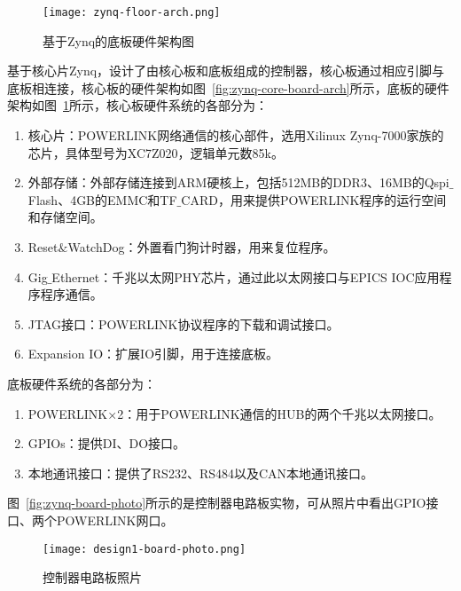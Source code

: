 \begin{figure}[!htb]
  \centering
  \texttt{[image: zynq-floor-arch.png]}
  \caption{基于Zynq的底板硬件架构图}
  \label{fig:zynq-floor-arch}
\end{figure}

基于核心片Zynq，设计了由核心板和底板组成的控制器，核心板通过相应引脚与底板相连接，核心板的硬件架构如图~\ref{fig:zynq-core-board-arch}所示，底板的硬件架构如图~\ref{fig:zynq-floor-arch}所示，核心板硬件系统的各部分为：

\begin{enumerate}
  \item 核心片：POWERLINK网络通信的核心部件，选用Xilinux Zynq-7000家族的芯片，具体型号为XC7Z020，逻辑单元数85k。

  \item 外部存储：外部存储连接到ARM硬核上，包括512MB的DDR3、16MB的Qspi$\_$Flash、4GB的EMMC和TF$\_$CARD，用来提供POWERLINK程序的运行空间和存储空间。

  \item Reset$\&$WatchDog：外置看门狗计时器，用来复位程序。

  \item Gig$\_$Ethernet：千兆以太网PHY芯片，通过此以太网接口与EPICS IOC应用程序程序通信。

  \item JTAG接口：POWERLINK协议程序的下载和调试接口。
 
  \item Expansion IO：扩展IO引脚，用于连接底板。
\end{enumerate}

底板硬件系统的各部分为：

\begin{enumerate}
  \item POWERLINK×2：用于POWERLINK通信的HUB的两个千兆以太网接口。

  \item GPIOs：提供DI、DO接口。

  \item 本地通讯接口：提供了RS232、RS484以及CAN本地通讯接口。
\end{enumerate}

图~\ref{fig:zynq-board-photo}所示的是控制器电路板实物，可从照片中看出GPIO接口、两个POWERLINK网口。

\begin{figure}[!htb]
  \centering
  \texttt{[image: design1-board-photo.png]}
  \caption{控制器电路板照片}
  \label{fig:design1-board-photo}
\end{figure}

